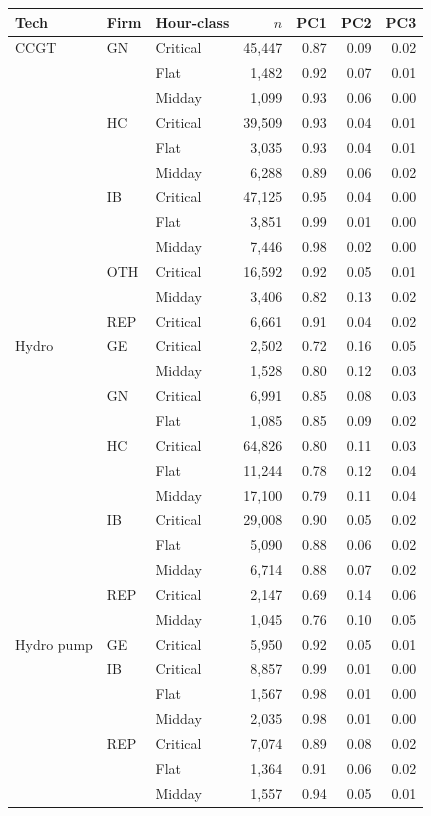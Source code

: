 \begin{tabular}{l l l r r r r}
\toprule
Tech & Firm & Hour-class & $n$ & PC1 & PC2 & PC3 \\
\midrule
CCGT & GN & Critical & 45,447 & 0.87 & 0.09 & 0.02 \\
 &  & Flat & 1,482 & 0.92 & 0.07 & 0.01 \\
 &  & Midday & 1,099 & 0.93 & 0.06 & 0.00 \\
 & HC & Critical & 39,509 & 0.93 & 0.04 & 0.01 \\
 &  & Flat & 3,035 & 0.93 & 0.04 & 0.01 \\
 &  & Midday & 6,288 & 0.89 & 0.06 & 0.02 \\
 & IB & Critical & 47,125 & 0.95 & 0.04 & 0.00 \\
 &  & Flat & 3,851 & 0.99 & 0.01 & 0.00 \\
 &  & Midday & 7,446 & 0.98 & 0.02 & 0.00 \\
 & OTH & Critical & 16,592 & 0.92 & 0.05 & 0.01 \\
 &  & Midday & 3,406 & 0.82 & 0.13 & 0.02 \\
 & REP & Critical & 6,661 & 0.91 & 0.04 & 0.02 \\
\addlinespace
Hydro & GE & Critical & 2,502 & 0.72 & 0.16 & 0.05 \\
 &  & Midday & 1,528 & 0.80 & 0.12 & 0.03 \\
 & GN & Critical & 6,991 & 0.85 & 0.08 & 0.03 \\
 &  & Flat & 1,085 & 0.85 & 0.09 & 0.02 \\
 & HC & Critical & 64,826 & 0.80 & 0.11 & 0.03 \\
 &  & Flat & 11,244 & 0.78 & 0.12 & 0.04 \\
 &  & Midday & 17,100 & 0.79 & 0.11 & 0.04 \\
 & IB & Critical & 29,008 & 0.90 & 0.05 & 0.02 \\
 &  & Flat & 5,090 & 0.88 & 0.06 & 0.02 \\
 &  & Midday & 6,714 & 0.88 & 0.07 & 0.02 \\
 & REP & Critical & 2,147 & 0.69 & 0.14 & 0.06 \\
 &  & Midday & 1,045 & 0.76 & 0.10 & 0.05 \\
\addlinespace
Hydro pump & GE & Critical & 5,950 & 0.92 & 0.05 & 0.01 \\
 & IB & Critical & 8,857 & 0.99 & 0.01 & 0.00 \\
 &  & Flat & 1,567 & 0.98 & 0.01 & 0.00 \\
 &  & Midday & 2,035 & 0.98 & 0.01 & 0.00 \\
 & REP & Critical & 7,074 & 0.89 & 0.08 & 0.02 \\
 &  & Flat & 1,364 & 0.91 & 0.06 & 0.02 \\
 &  & Midday & 1,557 & 0.94 & 0.05 & 0.01 \\
\bottomrule
\end{tabular}